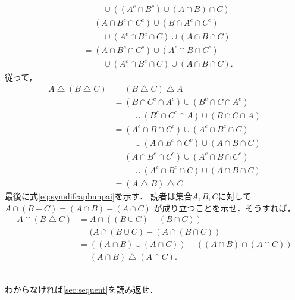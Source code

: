 \begin{description}
\begin{align*}
    & \hspace{1cm} \cup ((A^c \cap B^c) \cup (A \cap B) \cap C) \\
    & = (A \cap B^c \cap C^c ) \cup (B \cap A ^c \cap C^c) \\
    & \hspace{1cm} \cup (A^c \cap B^c \cap C) \cup (A \cap B \cap C) \\
    & = (A \cap B^c \cap C^c ) \cup (A^c \cap B \cap C^c) \\
    & \hspace{1cm} \cup (A^c \cap B^c \cap C) \cup (A \cap B \cap C).
  \end{align*}
  従って，
  \begin{align*}
    A \bigtriangleup (B \bigtriangleup C) 
    & = (B \bigtriangleup C) \bigtriangleup A \\
    & = (B \cap C^c \cap A^c) \cup (B^c \cap C \cap A^c) \\
    & \hspace{1cm} \cup (B^c \cap C^c \cap A) \cup (B \cap C \cap A) \\
    & = (A^c \cap B \cap C^c) \cup (A^c \cap B^c \cap C) \\
    & \hspace{1cm} \cup (A \cap B^c \cap C^c) \cup (A \cap B \cap C) \\
    & = (A \cap B^c \cap C^c) \cup (A^c \cap B \cap C^c) \\
    & \hspace{1cm} \cup (A^c \cap B^c \cap C) \cup (A \cap B \cap C) \\
    & = (A \bigtriangleup B) \bigtriangleup C .
  \end{align*}
  最後に式\eqref{eq:symdifcapbunpai}を示す．
  読者は集合$A,  B,  C$に対して$A \cap (B-C) = (A \cap B) - (A \cap C)$
  が成り立つことを示せ．そうすれば，
  \begin{align*}
    A \cap (B \bigtriangleup C) & = A \cap ((B \cup C) - (B \cap C)) \\
                                & = (A \cap (B \cup C) - (A \cap (B \cap C) ) \\
                                & = ((A \cap B ) \cup (A \cap C)) - ((A \cap B) \cap (A \cap C)) \\
                                & = (A \cap B) \bigtriangleup (A \cap C) .
  \end{align*}
\item[\refque{que:setfamilycupcap}] \mbox{} \\
  わからなければ\ref{sec:sequent}を読み返せ．

\end{description}
